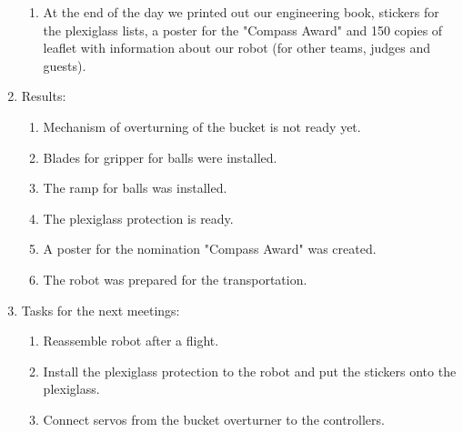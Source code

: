 \begin{enumerate}
\begin{enumerate}
	   \item At the end of the day we printed out our engineering book, stickers for the plexiglass lists, a poster for the "Compass Award" and 150 copies of leaflet with information about our robot (for other teams, judges and guests).

	\end{enumerate}
	
	\item Results:
	\begin{enumerate}
		
		\item Mechanism of overturning of the bucket is not ready yet.
		
		\item Blades for gripper for balls were installed.
		
		\item The ramp for balls was installed.
		
		\item The plexiglass protection is ready.
		
		\item A poster for the nomination "Compass Award" was created.
		
		\item The robot was prepared for the transportation. 
		
	\end{enumerate}
	
	\item Tasks for the next meetings:
	\begin{enumerate}
		
		\item Reassemble robot after a flight.
		
		\item Install the plexiglass protection to the robot and put the stickers onto the plexiglass.
		
        \item Connect servos from the bucket overturner to the controllers.
			
	\end{enumerate}
\end{enumerate}
\fillpage
